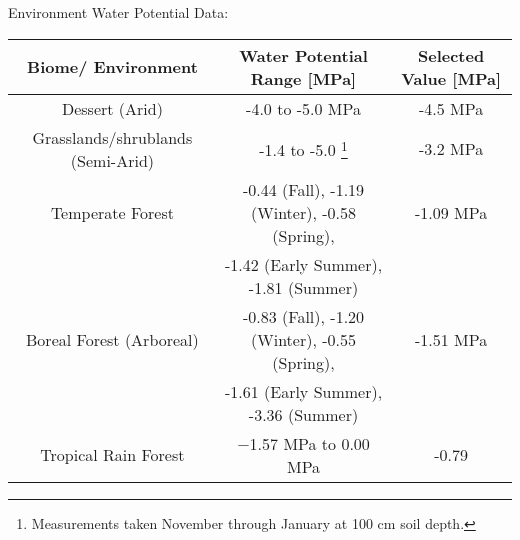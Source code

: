 \documentclass{article}
\begin{document}
Environment Water Potential Data:
\begin{savenotes}
\begin{table}[H]
\begin{center}
 \begin{tabular}{|c c c|} 
 \hline
 Biome/ Environment & Water Potential Range [MPa] & Selected Value [MPa] \\ [0.5ex] 
 \hline\hline
 Dessert (Arid) & -4.0 to -5.0 MPa \cite{Nilsen1983} & -4.5 MPa \\ 
 \hline
 Grasslands/shrublands (Semi-Arid) & -1.4 to -5.0 \footnote{Measurements taken November through January at 100 cm soil depth.} \cite{Pelaez 1994} & -3.2 MPa\\
 \hline
 Temperate Forest & -0.44 (Fall), -1.19 (Winter), -0.58 (Spring), & -1.09 MPa\\
 &-1.42 (Early Summer), -1.81 (Summer) \cite{Zobel2001}&\\
 \hline
 Boreal Forest (Arboreal) & -0.83 (Fall), -1.20 (Winter), -0.55 (Spring),& -1.51 MPa\\
 &-1.61 (Early Summer), -3.36 (Summer) \cite{Zobel2001} &\\
 \hline
 Tropical Rain Forest & −1.57 MPa to 0.00 MPa  \cite{Kupers2018} & -0.79 \\ 
 \hline
\end{tabular}
\end{center}
\end{table}
\end{savenotes}
\end{document}
